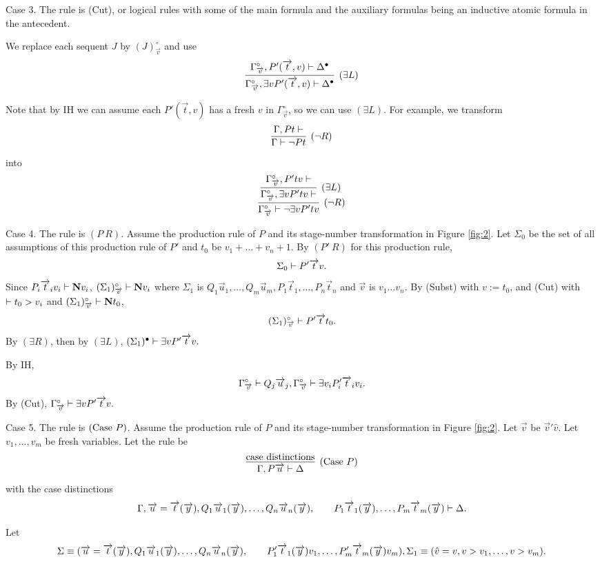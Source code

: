 Case 3. The rule is (Cut),
or logical rules with
some of the main formula and the auxiliary formulas being
an inductive atomic formula in the antecedent.

We replace each sequent $J$ by $(J)^\circ_{\Vec v}$ and
use
\[
\infer[(\exists L)]{\Gamma^\circ_{\Vec v},\exists vP'(\Vec t,v) \prove \Delta^\bullet}{\Gamma^\circ_{\Vec v},P'(\Vec t,v) \prove \Delta^\bullet}
\]

Note that by IH we can assume each $P'(\Vec t,v)$ has a fresh $v$ in $\Gamma^\circ_{\Vec v}$,
so we can use $(\exists L)$.
For example, we transform
\[
\infer[(\neg R)]{\Gamma \prove \neg Pt}{\Gamma,Pt \prove}
\]
into
\[
\infer[(\neg R)]{\Gamma^\circ_{\Vec v} \prove \neg \exists vP'tv}{
\infer[(\exists L)]{\Gamma^\circ_{\Vec v},\exists vP'tv \prove}{
\Gamma^\circ_{\Vec v},P'tv \prove
}}
\]

Case 4. The rule is $(P\ R)$. 
Assume the production rule of $P$ 
and its stage-number transformation in Figure \ref{fig:2}.
Let $\Sigma_0$ be the set of all assumptions of this production rule of $P'$
and $t_0$ be $v_1+\ldots+v_n+1$.
By $(P'\ R)$ for this production rule,
\[
\Sigma_0 \prove P'\Vec tv.
\]
Since $P_i\Vec t_iv_i \prove \N v_i$, $(\Sigma_1)^\circ_{\Vec v} \prove \N v_i$
where $\Sigma_1$ is $Q_1\Vec u_1, \ldots, Q_m\Vec u_m,
P_1\Vec t_1, \ldots, P_n\Vec t_n$ and $\Vec v$ is $v_1\ldots v_n$.
By (Subst) with $v:=t_0$,
and
(Cut) with $\prove t_0 > v_i$ and $(\Sigma_1)^\circ_{\Vec v} \prove \N t_0$,
\[
(\Sigma_1)^\circ_{\Vec v} \prove P'\Vec tt_0.
\]
By $(\exists R)$, then by $(\exists L)$,
$
(\Sigma_1)^\bullet \prove \exists vP'\Vec tv.
$

By IH,
\[
\Gamma^\circ_{\Vec v} \prove Q_j\Vec u_j, \\
\Gamma^\circ_{\Vec v} \prove \exists v_iP'_i\Vec t_iv_i.
\]
By (Cut),
$
\Gamma^\circ_{\Vec v} \prove \exists vP'\Vec tv.
$

Case 5. The rule is $(\Case\ P)$.
Assume the production rule of $P$ 
and its stage-number transformation in Figure \ref{fig:2}.
Let $\Vec v$ be $\Vec v'\hat v$.
Let $v_1,\ldots,v_m$ be fresh variables.
Let the rule be
\[
\infer[(\Case\ P)]{\Gamma,P\Vec u \prove \Delta}{
\hbox{case distinctions}
}
\]
with the case distinctions
\[
\Gamma, \Vec u=\Vec t(\Vec y),Q_1\Vec u_1(\Vec y),\ldots, Q_n\Vec u_n(\Vec y), 
\\ \qquad
P_1\Vec t_1(\Vec y), \ldots, P_m\Vec t_m(\Vec y)
\prove \Delta.
\]

Let
\[
\Sigma \equiv (\Vec u=\Vec t(\Vec y), Q_1\Vec u_1(\Vec y), \ldots, Q_n\Vec u_n(\Vec y),
\\ \qquad
P'_1\Vec t_1(\Vec y)v_1, \ldots, P'_m\Vec t_m(\Vec y)v_m), \\
\Sigma_1 \equiv (\hat v=v,v > v_1,\ldots,v > v_m).
\]

